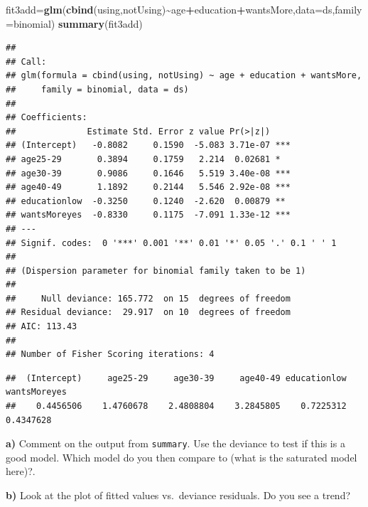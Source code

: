 \documentclass[
]{article}
\newenvironment{Shaded}{\begin{snugshade}}{\end{snugshade}}
\newcommand{\AttributeTok}[1]{\textcolor[rgb]{0.13,0.29,0.53}{#1}}
\newcommand{\FunctionTok}[1]{\textcolor[rgb]{0.13,0.29,0.53}{\textbf{#1}}}
\newcommand{\NormalTok}[1]{#1}
\newcommand{\OtherTok}[1]{\textcolor[rgb]{0.56,0.35,0.01}{#1}}
\newcommand{\SpecialCharTok}[1]{\textcolor[rgb]{0.81,0.36,0.00}{\textbf{#1}}}
\begin{document}
\begin{Shaded}
\begin{Highlighting}[]
\NormalTok{fit3add}\OtherTok{=}\FunctionTok{glm}\NormalTok{(}\FunctionTok{cbind}\NormalTok{(using,notUsing)}\SpecialCharTok{\textasciitilde{}}\NormalTok{age}\SpecialCharTok{+}\NormalTok{education}\SpecialCharTok{+}\NormalTok{wantsMore,}\AttributeTok{data=}\NormalTok{ds,}\AttributeTok{family=}\NormalTok{binomial)}
\FunctionTok{summary}\NormalTok{(fit3add)}
\end{Highlighting}
\end{Shaded}

\begin{verbatim}
## 
## Call:
## glm(formula = cbind(using, notUsing) ~ age + education + wantsMore, 
##     family = binomial, data = ds)
## 
## Coefficients:
##              Estimate Std. Error z value Pr(>|z|)    
## (Intercept)   -0.8082     0.1590  -5.083 3.71e-07 ***
## age25-29       0.3894     0.1759   2.214  0.02681 *  
## age30-39       0.9086     0.1646   5.519 3.40e-08 ***
## age40-49       1.1892     0.2144   5.546 2.92e-08 ***
## educationlow  -0.3250     0.1240  -2.620  0.00879 ** 
## wantsMoreyes  -0.8330     0.1175  -7.091 1.33e-12 ***
## ---
## Signif. codes:  0 '***' 0.001 '**' 0.01 '*' 0.05 '.' 0.1 ' ' 1
## 
## (Dispersion parameter for binomial family taken to be 1)
## 
##     Null deviance: 165.772  on 15  degrees of freedom
## Residual deviance:  29.917  on 10  degrees of freedom
## AIC: 113.43
## 
## Number of Fisher Scoring iterations: 4
\end{verbatim}

\begin{Shaded}
\end{Shaded}

\begin{verbatim}
##  (Intercept)     age25-29     age30-39     age40-49 educationlow wantsMoreyes 
##    0.4456506    1.4760678    2.4808804    3.2845805    0.7225312    0.4347628
\end{verbatim}

\textbf{a)} Comment on the output from \texttt{summary}. Use the
deviance to test if this is a good model. Which model do you then
compare to (what is the saturated model here)?.

\textbf{b)} Look at the plot of fitted values vs.~deviance residuals. Do
you see a trend?
\end{document}
